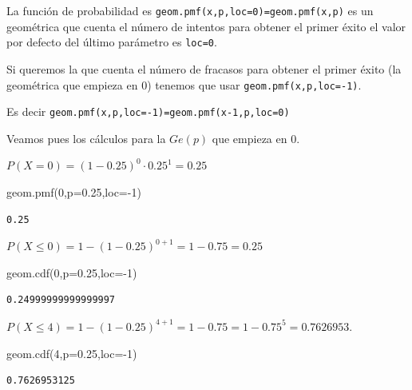 \documentclass[
  letterpaper,
  DIV=11,
  numbers=noendperiod]{scrreprt}
\newenvironment{Shaded}{\begin{snugshade}}{\end{snugshade}}
\newcommand{\DecValTok}[1]{\textcolor[rgb]{0.68,0.00,0.00}{#1}}
\newcommand{\FloatTok}[1]{\textcolor[rgb]{0.68,0.00,0.00}{#1}}
\newcommand{\NormalTok}[1]{\textcolor[rgb]{0.00,0.23,0.31}{#1}}
\newcommand{\OperatorTok}[1]{\textcolor[rgb]{0.37,0.37,0.37}{#1}}
\begin{document}
La función de probabilidad es \texttt{geom.pmf(x,p,loc=0)=geom.pmf(x,p)}
es un geométrica que cuenta el número de intentos para obtener el primer
éxito el valor por defecto del último parámetro es \texttt{loc=0}.

Si queremos la que cuenta el número de fracasos para obtener el primer
éxito (la geométrica que empieza en 0) tenemos que usar
\texttt{geom.pmf(x,p,loc=-1)}.

Es decir \texttt{geom.pmf(x,p,loc=-1)=geom.pmf(x-1,p,loc=0)}

Veamos pues los cálculos para la \(Ge(p)\) que empieza en \(0\).

\(P(X=0)=(1-0.25)^0\cdot 0.25^1=0.25\)

\begin{Shaded}
\begin{Highlighting}[]
\NormalTok{geom.pmf(}\DecValTok{0}\NormalTok{,p}\OperatorTok{=}\FloatTok{0.25}\NormalTok{,loc}\OperatorTok{={-}}\DecValTok{1}\NormalTok{)}
\end{Highlighting}
\end{Shaded}

\begin{verbatim}
0.25
\end{verbatim}

\(P(X\leq 0)=1- (1-0.25)^{0+1}=1-0.75=0.25\)

\begin{Shaded}
\begin{Highlighting}[]
\NormalTok{geom.cdf(}\DecValTok{0}\NormalTok{,p}\OperatorTok{=}\FloatTok{0.25}\NormalTok{,loc}\OperatorTok{={-}}\DecValTok{1}\NormalTok{)}
\end{Highlighting}
\end{Shaded}

\begin{verbatim}
0.24999999999999997
\end{verbatim}

\(P(X\leq 4)=1-(1-0.25)^{4+1}=1-0.75=1-0.75^5=0.7626953.\)

\begin{Shaded}
\begin{Highlighting}[]
\NormalTok{geom.cdf(}\DecValTok{4}\NormalTok{,p}\OperatorTok{=}\FloatTok{0.25}\NormalTok{,loc}\OperatorTok{={-}}\DecValTok{1}\NormalTok{)}
\end{Highlighting}
\end{Shaded}

\begin{verbatim}
0.7626953125
\end{verbatim}
\end{document}
